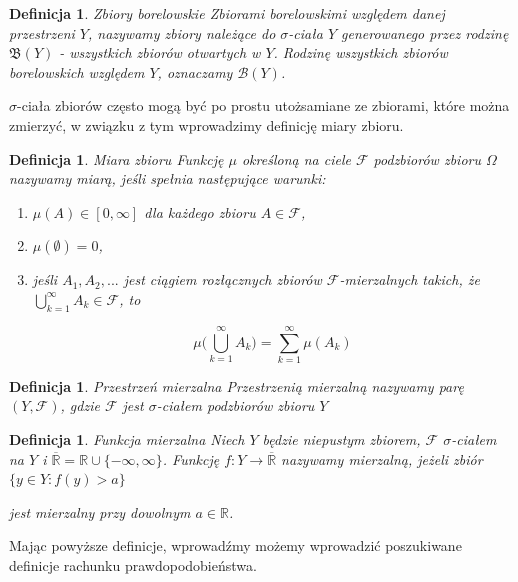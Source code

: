 \documentclass[12pt,a4paper]{report}
\newtheorem{definition}[theorem]{Definicja}
\begin{document}
\begin{definition}{Zbiory borelowskie \cite[w opraciu o rozdział 2]{billingsley1987}}
Zbiorami borelowskimi względem danej przestrzeni $Y$, nazywamy zbiory należące do $\sigma$-ciała $Y$ generowanego przez rodzinę $\mathfrak{B}(Y)$ - wszystkich zbiorów otwartych w $Y$. Rodzinę wszystkich zbiorów borelowskich względem $Y$, oznaczamy $\mathcal{B}(Y)$.
\end{definition}

$\sigma$-ciała zbiorów często mogą być po prostu utożsamiane ze zbiorami, które można zmierzyć, w związku z tym wprowadzimy definicję miary zbioru.

\begin{definition}{Miara zbioru \cite[Rozdział 2.10] {billingsley1987}}
Funkcję $\mu$ określoną na ciele $\mathcal{F}$ podzbiorów zbioru $\Omega$ nazywamy miarą, jeśli spełnia następujące warunki: 
\begin{enumerate}
\item $\mu(A) \in [0, \infty]$ dla każdego zbioru $A \in \mathcal{F}$,
\item $\mu(\emptyset)=0$,
\item jeśli $A_1, A_2,...$ jest ciągiem rozłącznych zbiorów $\mathcal{F}$-mierzalnych takich, że $\bigcup\limits_{k=1}^{\infty} A_k \in \mathcal{F}$, to 

$$\mu\big(\bigcup\limits_{k=1}^{\infty} A_k\big)=\sum_{k=1}^{\infty} \mu(A_k)$$

\end{enumerate}
\end{definition}


\begin{definition}{Przestrzeń mierzalna \cite[Rozdział 2.10]{billingsley1987}}
Przestrzenią mierzalną nazywamy parę $(Y, \mathcal{F})$, gdzie $\mathcal{F}$ jest $\sigma$-ciałem podzbiorów zbioru $Y$
\end{definition}


\begin{definition}{Funkcja mierzalna \cite[w oparciu o rozdział 8.2]{rudnicki2006}}
Niech $Y$ będzie niepustym zbiorem, $\mathcal{F}$  $\sigma$-ciałem na $Y$ i $\overline{\mathbb{R}} = \mathbb{R} \cup \{-\infty, \infty \}$. Funkcję $f: Y \rightarrow \overline{\mathbb{R}}$ nazywamy mierzalną, jeżeli zbiór
$\{ y \in Y: f(y) > a \}$

jest mierzalny przy dowolnym $a \in \mathbb{R}$.
\end{definition}

Mając powyższe definicje, wprowadźmy możemy wprowadzić poszukiwane definicje rachunku prawdopodobieństwa. 
\end{document}
